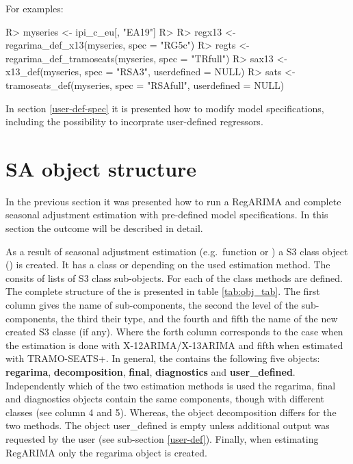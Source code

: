 \documentclass[article]{jss}
\begin{document}
For examples:

\begin{CodeChunk}

\begin{CodeInput}
R> myseries <- ipi_c_eu[, "EA19"]
R> 
R> regx13 <- regarima_def_x13(myseries, spec = "RG5c")
R> regts <- regarima_def_tramoseats(myseries, spec = "TRfull")
R> sax13 <- x13_def(myseries, spec = "RSA3", userdefined = NULL)
R> sats <- tramoseats_def(myseries, spec = "RSAfull", userdefined = NULL)
\end{CodeInput}
\end{CodeChunk}

In section \ref{user-def-spec} it is presented how to modify model
specifications, including the possibility to incorprate user-defined
regressors.

\hypertarget{sa-object-structure}{%
\section{SA object structure}\label{sa-object-structure}}

In the previous section it was presented how to run a RegARIMA and
complete seasonal adjustment estimation with pre-defined model
specifications. In this section the outcome will be described in detail.

As a result of seasonal adjustment estimation (e.g.~function
 or ) a S3 class object
() is created. It has a class  or
 depending on the used estimation method.
The  consits of lists of S3 class sub-objects. For each
of the class  methods are defined. The complete
structure of the  is presented in table
\ref{tab:obj_tab}. The first column gives the name of 
sub-components, the second the level of the sub-components, the third
their type, and the fourth and fifth the name of the new created S3
classe (if any). Where the forth column corresponds to the case when the
estimation is done with X-12ARIMA/X-13ARIMA and fifth when estimated
with TRAMO-SEATS+. In general, the  contains the
following five objects: \textbf{regarima}, \textbf{decomposition},
\textbf{final}, \textbf{diagnostics} and \textbf{user\_defined}.
Independently which of the two estimation methods is used the regarima,
final and diagnostics objects contain the same components, though with
different classes (see column 4 and 5). Whereas, the object
decomposition differs for the two methods. The object user\_defined is
empty unless additional output was requested by the user (see
sub-section \ref{user-def}). Finally, when estimating RegARIMA only the
regarima object is created.
\end{document}
